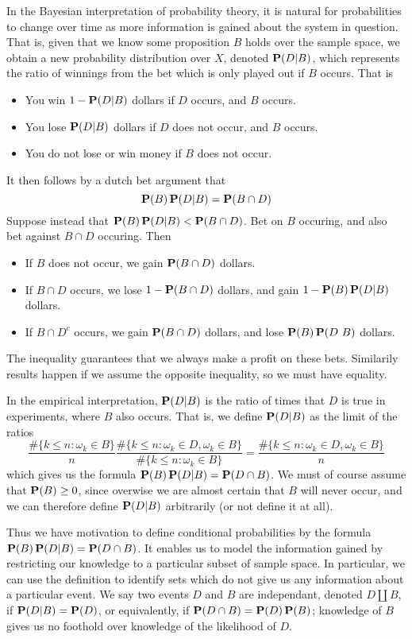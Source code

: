In the Bayesian interpretation of probability theory, it is natural for probabilities to change over time as more information is gained about the system in question. That is, given that we know some proposition $B$ holds over the sample space, we obtain a new probability distribution over $X$, denoted $\operatorname{\mathbf{P}}(D | B)$, which represents the ratio of winnings from the bet which is only played out if $B$ occurs. That is
%
\begin{itemize}
    \item You win $1-\operatorname{\mathbf{P}}(D|B)$ dollars if $D$ occurs, and $B$ occurs.
    \item You lose $\operatorname{\mathbf{P}}(D|B)$ dollars if $D$ does not occur, and $B$ occurs.
    \item You do not lose or win money if $B$ does not occur.
\end{itemize}
%
It then follows by a dutch bet argument that
%
\[ \operatorname{\mathbf{P}}(B) \operatorname{\mathbf{P}}(D | B) = \operatorname{\mathbf{P}}(B \cap D) \]
%
Suppose instead  that $\operatorname{\mathbf{P}}(B) \operatorname{\mathbf{P}}(D|B) < \operatorname{\mathbf{P}}(B \cap D)$. Bet on $B$ occuring, and also bet against $B \cap D$ occuring. Then
%
\begin{itemize}
    \item If $B$ does not occur, we gain $\operatorname{\mathbf{P}}(B \cap D)$ dollars.
    \item If $B \cap D$ occurs, we lose $1 - \operatorname{\mathbf{P}}(B \cap D)$ dollars, and gain $1 - \operatorname{\mathbf{P}}(B) \operatorname{\mathbf{P}}(D | B)$ dollars.
    \item If $B \cap D^c$ occurs, we gain $\operatorname{\mathbf{P}}(B \cap D)$ dollars, and lose $\Prob(B) \Prob(D \ B)$ dollars.
\end{itemize}
%
The inequality guarantees that we always make a profit on these bets. Similarily results happen if we assume the opposite inequality, so we must have equality.

In the empirical interpretation, $\operatorname{\mathbf{P}}(D | B)$ is the ratio of times that $D$ is true in experiments, where $B$ also occurs. That is, we define $\operatorname{\mathbf{P}}(D | B)$ as the limit of the ratios
%
\[ \frac{\# \{ k \leq n : \omega_k \in B \}}{n} \frac{\# \{ k \leq n : \omega_k \in D, \omega_k \in B \}}{\# \{ k \leq n : \omega_k \in B \}} = \frac{\# \{ k \leq n : \omega_k \in D, \omega_k \in B \}}{n} \]
%
which gives us the formula $\operatorname{\mathbf{P}}(B) \operatorname{\mathbf{P}}(D | B) = \operatorname{\mathbf{P}}(D \cap B)$. We must of course assume that $\operatorname{\mathbf{P}}(B) \geq 0$, since overwise we are almost certain that $B$ will never occur, and we can therefore define $\operatorname{\mathbf{P}}(D | B)$ arbitrarily (or not define it at all).

Thus we have motivation to define conditional probabilities by the formula $\operatorname{\mathbf{P}}(B) \operatorname{\mathbf{P}}(D | B) = \operatorname{\mathbf{P}}(D \cap B)$. It enables us to model the information gained by restricting our knowledge to a particular subset of sample space. In particular, we can use the definition to identify sets which do not give us any information about a particular event. We say two events $D$ and $B$ are independant, denoted $D \amalg B$, if $\operatorname{\mathbf{P}}(D | B) = \operatorname{\mathbf{P}}(D)$, or equivalently, if $\operatorname{\mathbf{P}}(D \cap B) = \operatorname{\mathbf{P}}(D) \operatorname{\mathbf{P}}(B)$; knowledge of $B$ gives us no foothold over knowledge of the likelihood of $D$.

